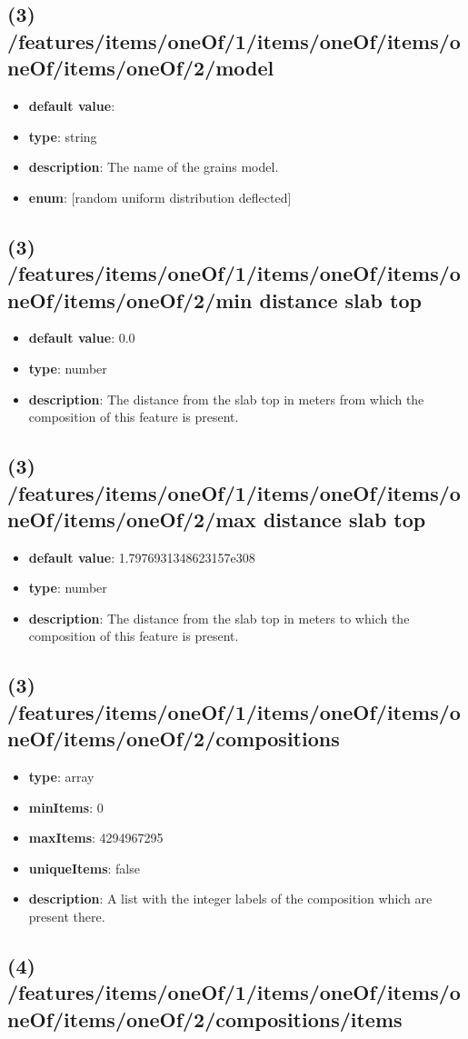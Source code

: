 \subsection{(3) /features/items/oneOf/1/items/oneOf/items/oneOf/items/oneOf/2/model}
\begin{itemize}[leftmargin=3em]\item {\bf default value}: 
\item {\bf type}: string
\item {\bf description}: The name of the grains model.
\item {\bf enum}: [random uniform distribution deflected]\end{itemize}\subsection{(3) /features/items/oneOf/1/items/oneOf/items/oneOf/items/oneOf/2/min distance slab top}
\begin{itemize}[leftmargin=3em]\item {\bf default value}: 0.0
\item {\bf type}: number
\item {\bf description}: The distance from the slab top in meters from which the composition of this feature is present.
\end{itemize}\subsection{(3) /features/items/oneOf/1/items/oneOf/items/oneOf/items/oneOf/2/max distance slab top}
\begin{itemize}[leftmargin=3em]\item {\bf default value}: 1.7976931348623157e308
\item {\bf type}: number
\item {\bf description}: The distance from the slab top in meters to which the composition of this feature is present.
\end{itemize}\subsection{(3) /features/items/oneOf/1/items/oneOf/items/oneOf/items/oneOf/2/compositions}
\begin{itemize}[leftmargin=3em]\item {\bf type}: array
\item {\bf minItems}: 0
\item {\bf maxItems}: 4294967295
\item {\bf uniqueItems}: false
\item {\bf description}: A list with the integer labels of the composition which are present there.
\end{itemize}\subsection{(4) /features/items/oneOf/1/items/oneOf/items/oneOf/items/oneOf/2/compositions/items}
